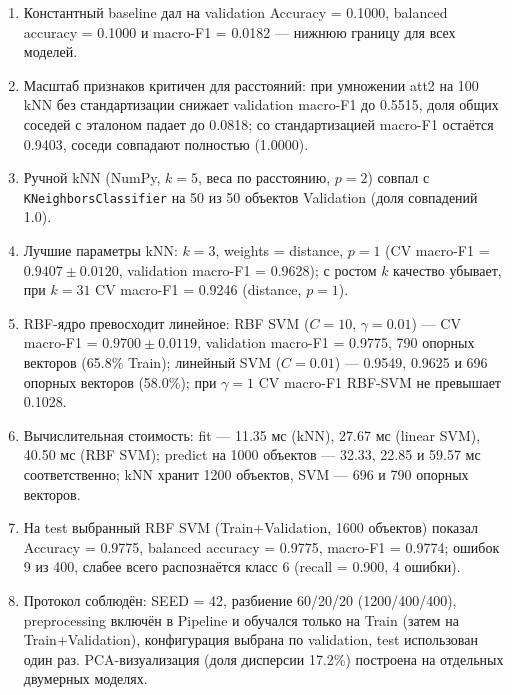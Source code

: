 \documentclass[14pt,a4paper]{extarticle}
\newcommand{\sd}{\ensuremath{\pm}}
\begin{document}
\begin{enumerate}
\item Константный baseline дал на validation Accuracy = 0.1000, balanced accuracy = 0.1000 и macro-F1 = 0.0182 --- нижнюю границу для всех моделей.
\item Масштаб признаков критичен для расстояний: при умножении att2 на 100 kNN без стандартизации снижает validation macro-F1 до 0.5515, доля общих соседей с эталоном падает до 0.0818; со стандартизацией macro-F1 остаётся 0.9403, соседи совпадают полностью (1.0000).
\item Ручной kNN (NumPy, $k=5$, веса по расстоянию, $p=2$) совпал с \texttt{KNeighborsClassifier} на 50 из 50 объектов Validation (доля совпадений 1.0).
\item Лучшие параметры kNN: $k=3$, weights = distance, $p=1$ (CV macro-F1 = $0.9407\sd 0.0120$, validation macro-F1 = 0.9628); с ростом $k$ качество убывает, при $k=31$ CV macro-F1 = 0.9246 (distance, $p=1$).
\item RBF-ядро превосходит линейное: RBF SVM ($C=10$, $\gamma=0.01$) --- CV macro-F1 = $0.9700\sd 0.0119$, validation macro-F1 = 0.9775, 790 опорных векторов (65.8\% Train); линейный SVM ($C=0.01$) --- 0.9549, 0.9625 и 696 опорных векторов (58.0\%); при $\gamma=1$ CV macro-F1 RBF-SVM не превышает 0.1028.
\item Вычислительная стоимость: fit --- 11.35 мс (kNN), 27.67 мс (linear SVM), 40.50 мс (RBF SVM); predict на 1000 объектов --- 32.33, 22.85 и 59.57 мс соответственно; kNN хранит 1200 объектов, SVM --- 696 и 790 опорных векторов.
\item На test выбранный RBF SVM (Train+Validation, 1600 объектов) показал Accuracy = 0.9775, balanced accuracy = 0.9775, macro-F1 = 0.9774; ошибок 9 из 400, слабее всего распознаётся класс 6 (recall = 0.900, 4 ошибки).
\item Протокол соблюдён: SEED = 42, разбиение 60/20/20 (1200/400/400), preprocessing включён в Pipeline и обучался только на Train (затем на Train+Validation), конфигурация выбрана по validation, test использован один раз. PCA-визуализация (доля дисперсии 17.2\%) построена на отдельных двумерных моделях.
\end{enumerate}
\end{document}
